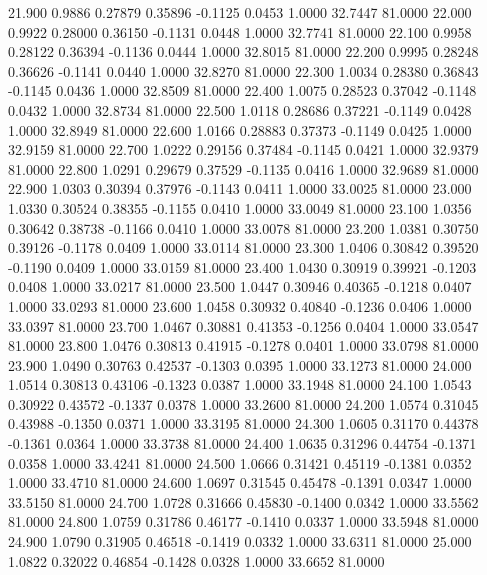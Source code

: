   21.900   0.9886   0.27879   0.35896  -0.1125   0.0453   1.0000  32.7447  81.0000
  22.000   0.9922   0.28000   0.36150  -0.1131   0.0448   1.0000  32.7741  81.0000
  22.100   0.9958   0.28122   0.36394  -0.1136   0.0444   1.0000  32.8015  81.0000
  22.200   0.9995   0.28248   0.36626  -0.1141   0.0440   1.0000  32.8270  81.0000
  22.300   1.0034   0.28380   0.36843  -0.1145   0.0436   1.0000  32.8509  81.0000
  22.400   1.0075   0.28523   0.37042  -0.1148   0.0432   1.0000  32.8734  81.0000
  22.500   1.0118   0.28686   0.37221  -0.1149   0.0428   1.0000  32.8949  81.0000
  22.600   1.0166   0.28883   0.37373  -0.1149   0.0425   1.0000  32.9159  81.0000
  22.700   1.0222   0.29156   0.37484  -0.1145   0.0421   1.0000  32.9379  81.0000
  22.800   1.0291   0.29679   0.37529  -0.1135   0.0416   1.0000  32.9689  81.0000
  22.900   1.0303   0.30394   0.37976  -0.1143   0.0411   1.0000  33.0025  81.0000
  23.000   1.0330   0.30524   0.38355  -0.1155   0.0410   1.0000  33.0049  81.0000
  23.100   1.0356   0.30642   0.38738  -0.1166   0.0410   1.0000  33.0078  81.0000
  23.200   1.0381   0.30750   0.39126  -0.1178   0.0409   1.0000  33.0114  81.0000
  23.300   1.0406   0.30842   0.39520  -0.1190   0.0409   1.0000  33.0159  81.0000
  23.400   1.0430   0.30919   0.39921  -0.1203   0.0408   1.0000  33.0217  81.0000
  23.500   1.0447   0.30946   0.40365  -0.1218   0.0407   1.0000  33.0293  81.0000
  23.600   1.0458   0.30932   0.40840  -0.1236   0.0406   1.0000  33.0397  81.0000
  23.700   1.0467   0.30881   0.41353  -0.1256   0.0404   1.0000  33.0547  81.0000
  23.800   1.0476   0.30813   0.41915  -0.1278   0.0401   1.0000  33.0798  81.0000
  23.900   1.0490   0.30763   0.42537  -0.1303   0.0395   1.0000  33.1273  81.0000
  24.000   1.0514   0.30813   0.43106  -0.1323   0.0387   1.0000  33.1948  81.0000
  24.100   1.0543   0.30922   0.43572  -0.1337   0.0378   1.0000  33.2600  81.0000
  24.200   1.0574   0.31045   0.43988  -0.1350   0.0371   1.0000  33.3195  81.0000
  24.300   1.0605   0.31170   0.44378  -0.1361   0.0364   1.0000  33.3738  81.0000
  24.400   1.0635   0.31296   0.44754  -0.1371   0.0358   1.0000  33.4241  81.0000
  24.500   1.0666   0.31421   0.45119  -0.1381   0.0352   1.0000  33.4710  81.0000
  24.600   1.0697   0.31545   0.45478  -0.1391   0.0347   1.0000  33.5150  81.0000
  24.700   1.0728   0.31666   0.45830  -0.1400   0.0342   1.0000  33.5562  81.0000
  24.800   1.0759   0.31786   0.46177  -0.1410   0.0337   1.0000  33.5948  81.0000
  24.900   1.0790   0.31905   0.46518  -0.1419   0.0332   1.0000  33.6311  81.0000
  25.000   1.0822   0.32022   0.46854  -0.1428   0.0328   1.0000  33.6652  81.0000

